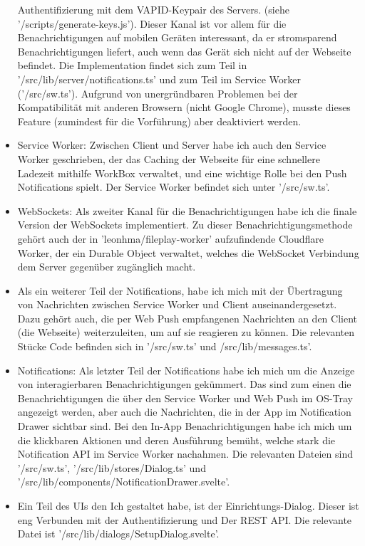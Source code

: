 \documentclass[a4paper]{article}
\begin{document}
\begin{itemize}
            Authentifizierung mit dem VAPID-Keypair des Servers. (siehe
            '/scripts/generate-keys.js'). Dieser Kanal ist vor allem für die
            Benachrichtigungen auf mobilen Geräten interessant, da er
            stromsparend Benachrichtigungen liefert, auch wenn das Gerät sich
            nicht auf der Webseite befindet. Die Implementation findet sich zum
            Teil in '/src/lib/server/notifications.ts' und zum Teil im Service
            Worker ('/src/sw.ts'). Aufgrund von unergründbaren Problemen bei der
            Kompatibilität mit anderen Browsern (nicht Google Chrome), musste
            dieses Feature (zumindest für die Vorführung) aber deaktiviert
            werden.
      \item Service Worker: Zwischen Client und Server habe ich auch den Service
            Worker geschrieben, der das Caching der Webseite für eine schnellere
            Ladezeit mithilfe WorkBox verwaltet, und eine wichtige Rolle bei den
            Push Notifications spielt. Der Service Worker befindet sich unter
            '/src/sw.ts'.
      \item WebSockets: Als zweiter Kanal für die Benachrichtigungen habe ich
            die finale Version der WebSockets implementiert. Zu dieser
            Benachrichtigungsmethode gehört auch der in
            'leonhma/fileplay-worker' aufzufindende Cloudflare Worker, der ein
            Durable Object verwaltet, welches die WebSocket Verbindung dem
            Server gegenüber zugänglich macht.
      \item Als ein weiterer Teil der Notifications, habe ich mich mit der
            Übertragung von Nachrichten zwischen Service Worker und Client
            auseinandergesetzt. Dazu gehört auch, die per Web Push empfangenen
            Nachrichten an den Client (die Webseite) weiterzuleiten, um auf sie
            reagieren zu können. Die relevanten Stücke Code befinden sich in
            '/src/sw.ts' und /src/lib/messages.ts'.
      \item Notifications: Als letzter Teil der Notifications habe ich mich um
            die Anzeige von interagierbaren Benachrichtigungen gekümmert. Das
            sind zum einen die Benachrichtigungen die über den Service Worker
            und Web Push im OS-Tray angezeigt werden, aber auch die Nachrichten,
            die in der App im Notification Drawer sichtbar sind. Bei den In-App
            Benachrichtigungen habe ich mich um die klickbaren Aktionen und
            deren Ausführung bemüht, welche stark die Notification API im
            Service Worker nachahmen. Die relevanten Dateien sind '/src/sw.ts',
            '/src/lib/stores/Dialog.ts' und
            '/src/lib/components/NotificationDrawer.svelte'.
      \item Ein Teil des UIs den Ich gestaltet habe, ist der
            Einrichtungs-Dialog. Dieser ist eng Verbunden mit der
            Authentifizierung und Der REST API. Die relevante Datei ist
            '/src/lib/dialogs/SetupDialog.svelte'.
\end{itemize}
\end{document}

